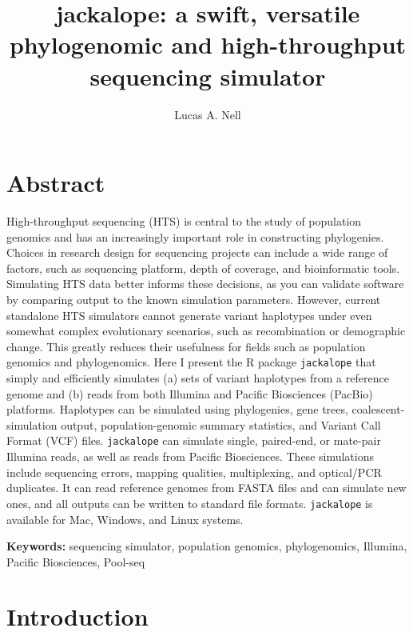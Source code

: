 \documentclass[12pt,]{article}
\title{
    jackalope: a swift, versatile phylogenomic and high-throughput sequencing simulator
            }
\author[1]{Lucas A. Nell}
\affil[1]{Department of Integrative Biology, University of Wisconsin--Madison}
\date{}
\makeatletter
\def\maketitle{{%
  \renewenvironment{tabular}[2][]
    {\begin{flushleft}}
    {\end{flushleft}}
  \AB@maketitle}}
\makeatother
\begin{document}
            \maketitle
        



\raggedright

\section*{Abstract}

High-throughput sequencing (HTS) is central to the study of population genomics
and has an increasingly important role in constructing phylogenies.
Choices in research design for sequencing projects can include
a wide range of factors, such as sequencing platform, depth of coverage, and
bioinformatic tools.
Simulating HTS data better informs these decisions, as you can validate software by
comparing output to the known simulation parameters.
However, current standalone HTS simulators cannot generate variant haplotypes under
even somewhat complex evolutionary scenarios, such as recombination or demographic change.
This greatly reduces their usefulness
for fields such as population genomics and phylogenomics.
Here I present the R package \texttt{jackalope} that simply and efficiently simulates
(a) sets of variant haplotypes from a reference genome and
(b) reads from both Illumina and Pacific Biosciences (PacBio) platforms.
Haplotypes can be simulated using phylogenies, gene trees,
coalescent-simulation output, population-genomic summary statistics,
and Variant Call Format (VCF) files.
\texttt{jackalope} can simulate single, paired-end, or mate-pair Illumina reads,
as well as reads from Pacific Biosciences.
These simulations include sequencing errors, mapping qualities, multiplexing,
and optical/PCR duplicates.
It can read reference genomes from FASTA files and can simulate new ones,
and all outputs can be written to standard file formats.
\texttt{jackalope} is available for Mac, Windows, and Linux systems.

\textbf{Keywords:} sequencing simulator, population genomics, phylogenomics,
Illumina, Pacific Biosciences, Pool-seq

\hypertarget{introduction}{%
\section{Introduction}\label{introduction}}
\end{document}
